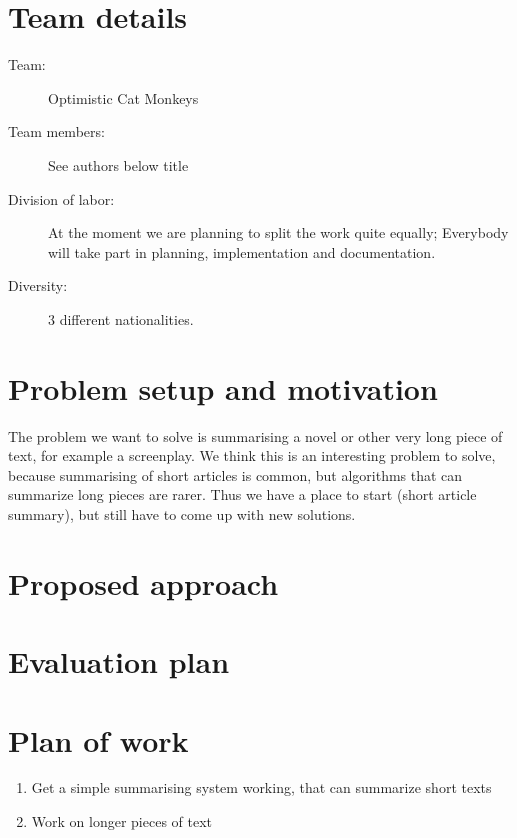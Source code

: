 \section{Team details}
\begin{description}
  \item[Team:] Optimistic Cat Monkeys
  \item[Team members:] See authors below title
  \item[Division of labor:] At the moment we are planning to split the work
    quite equally; Everybody will take part in planning, implementation and
    documentation.
  \item[Diversity:] 3 different nationalities.
\end{description}


\section{Problem setup and motivation}

The problem we want to solve is summarising a novel or other very long piece of
text, for example a screenplay. We think this is an interesting problem to
solve, because summarising of short articles is common, but algorithms that can
summarize long pieces are rarer. Thus we have a place to start (short article
summary), but still have to come up with new solutions.


\section{Proposed approach}


\section{Evaluation plan}


\section{Plan of work}

\begin{enumerate}
  \item Get a simple summarising system working, that can summarize short texts
  \item Work on longer pieces of text
\end{enumerate}
